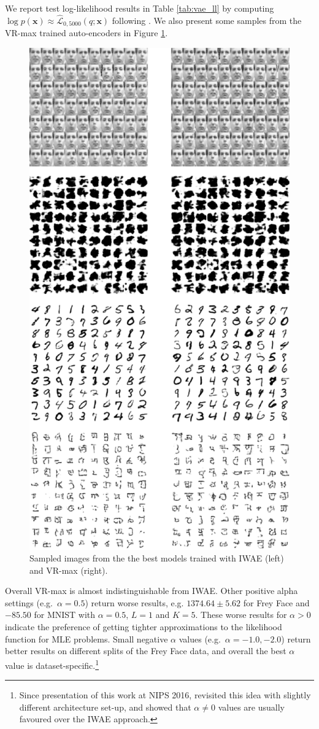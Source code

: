 We report test log-likelihood results in Table \ref{tab:vae_ll} by computing $\log p(\bm{x}) \approx \hat{\mathcal{L}}_{0, 5000}(q; \bm{x})$ following \cite{burda:iwae2016}. We also present some samples from the VR-max trained auto-encoders in Figure \ref{fig:vae_samples}.
%
\begin{figure}
 \centering
  \includegraphics[width=0.6\linewidth]{Chapter4/vrbound/figs/vae_samples.pdf}
  \caption{Sampled images from the the best models trained with IWAE (left) and VR-max (right).}
  \label{fig:vae_samples}
\end{figure}
%
Overall VR-max is almost indistinguishable from IWAE. Other positive alpha settings (e.g.~$\alpha = 0.5$) return worse results, e.g. $1374.64\pm5.62$ for Frey Face and $-85.50$ for MNIST with $\alpha = 0.5$, $L=1$ and $K=5$. These worse results for $\alpha > 0$ indicate the preference of getting tighter approximations to the likelihood function for MLE problems. Small negative $\alpha$ values (e.g.~$\alpha = -1.0, -2.0$) return better results on different splits of the Frey Face data, and overall the best $\alpha$ value is dataset-specific.\footnote{Since presentation of this work at NIPS 2016, \cite{bui:dgm2016} revisited this idea with slightly different architecture set-up, and showed that $\alpha \neq 0$ values are usually favoured over the IWAE approach. }

